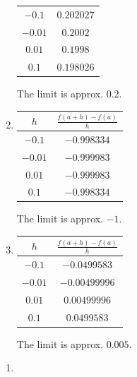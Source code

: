 \begin{multicols}{2}
\begin{enumialphparenastyle}
\begin{ex}
\begin{sol}
\begin{enumerate}
{\begin{tabular}{cc}
 $ -0.1$ & $0.202027$ \\
 $-0.01$ & $0.2002$ \\
 $0.01$ & $0.1998$ \\
 $0.1$ & $0.198026$
\end{tabular}
The limit is approx. $0.2$.
}
\item 
{\begin{tabular}{cc}
$h$ & $\frac{f(a+h)-f(a)}{h}$ \\ \hline 
 $ -0.1$ & $-0.998334$ \\
 $-0.01$ & $-0.999983$ \\
 $0.01$ & $-0.999983$ \\
 $0.1$ & $-0.998334$
\end{tabular}
The limit is approx. $-1$.
}
\item {\begin{tabular}{cc}
$h$ & $\frac{f(a+h)-f(a)}{h}$\\ \hline 
 $-0.1$ & $-0.0499583$ \\
 $-0.01$ & $-0.00499996$ \\
 $0.01$ & $0.00499996$ \\
 $0.1$ & $0.0499583$
\end{tabular}
The limit is approx. $0.005$.
}
\end{enumerate}
\end{sol}

\end{ex}

\begin{ex}
\begin{enumerate}
\item {
\begin{minipage}{\linewidth}\centering
{}
\end{minipage}

}
\end{enumerate}
\end{ex}
\end{enumialphparenastyle}
\end{multicols}

